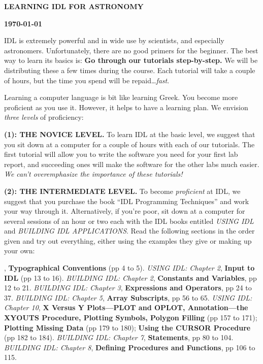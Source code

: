  

\centerline{\bf LEARNING IDL FOR ASTRONOMY}
\centerline{\bf \today}


	 IDL is extremely powerful and in wide use by scientists, and
especially astronomers.  Unfortunately, there are no good primers for
the beginner.  The best way to learn its basics is: {\bf Go through our
tutorials step-by-step.} We will be distributing these a few times
during the course.  Each tutorial will take a couple of hours, but the
time you spend will be repaid\dots {\it fast}. 

	Learning a computer language is bit like learning Greek.  You
become more proficient as you use it.  However, it helps to have a
learning plan.  We envision {\it three levels} of proficiency:

	{\bf (1): THE NOVICE LEVEL.} To learn IDL at the basic level, we
suggest that you sit down at a computer for a couple of hours with each
of our tutorials.  The first tutorial will allow you to write the
software you need for your first lab report, and succeeding ones will
make the software for the other labs much easier.  {\it We can't
overemphasize the importance of these tutorials!}

	{\bf (2): THE INTERMEDIATE LEVEL.} To become {\it proficient} at
IDL, we suggest that you purchase the book ``IDL Programming
Techniques'' and work your way through it.  Alternatively, if you're
poor, sit down at a computer for several sessions of an hour or two each
with the IDL books entitled {\it USING IDL} and {\it BUILDING IDL
APPLICATIONS}.  Read the following sections in the order given and try
out everything, either using the examples they give or making up your
own: %

, {\bf Typographical Conventions} (pp
4 to 5).  \hfil\break
	{\it USING IDL: Chapter 2}, {\bf Input to IDL} (pp 13 to 16). 
\hfil\break
	{\it BUILDING IDL: Chapter 2}, {\bf Constants and Variables}, pp
12 to 21. \hfil\break
	{\it BUILDING IDL: Chapter 3}, {\bf Expressions and Operators},
pp 24 to 37. \hfil\break
	{\it BUILDING IDL: Chapter 5}, {\bf Array Subscripts}, pp 56 to
65. \hfil\break
	{\it USING IDL: Chapter 10}, {\bf X Versus Y Plots---PLOT and
OPLOT, Annotation---the XYOUTS Procedure, Plotting Symbols, Polygon Filling}
(pp 157 to 171); {\bf Plotting Missing Data} (pp 179 to 180); {\bf Using
the CURSOR Procedure} (pp 182 to 184).  \hfil\break
	{\it BUILDING IDL: Chapter 7}, {\bf Statements}, pp 80 to 104.
\hfil\break
	{\it BUILDING IDL: Chapter 8}, {\bf Defining Procedures and
Functions}, pp 106 to 115. 

